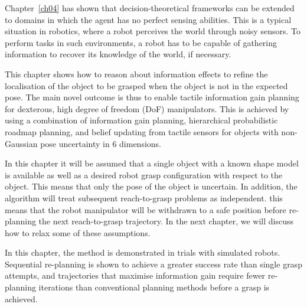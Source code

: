
Chapter~\ref{ch04} has shown that decision-theoretical frameworks can be extended to domains in which the agent has no perfect sensing abilities. This is a typical situation in robotics, where a robot perceives the world through noisy sensors. To perform tasks in such environments, a robot has to be capable of gathering information to recover its knowledge of the world, if necessary.

This chapter shows how to reason about information effects to refine the localisation of the object to be grasped when the object is not in the expected pose.
The main novel outcome is thus to enable tactile information gain planning for dexterous, high degree of freedom (DoF) manipulators. This is achieved by using a combination of  information gain planning, hierarchical probabilistic roadmap planning, and belief updating from tactile sensors for objects with non-Gaussian pose uncertainty in 6 dimensions. 

In this chapter it will be assumed that a single object with a known shape model is available as well as a desired robot grasp configuration with respect to the object. This means that only the pose of the object is uncertain. In addition, the algorithm will treat subsequent reach-to-grasp problems as independent. this means that the robot manipulator will be withdrawn to a safe position before re-planning the next reach-to-grasp trajectory. In the next chapter, we will discuss how to relax some of these assumptions. 

In this chapter, the method is demonstrated in trials with simulated robots. Sequential re-planning is shown to achieve a greater success rate than single grasp attempts, and trajectories that maximise information gain require fewer re-planning iterations than conventional planning methods before a grasp is achieved.

